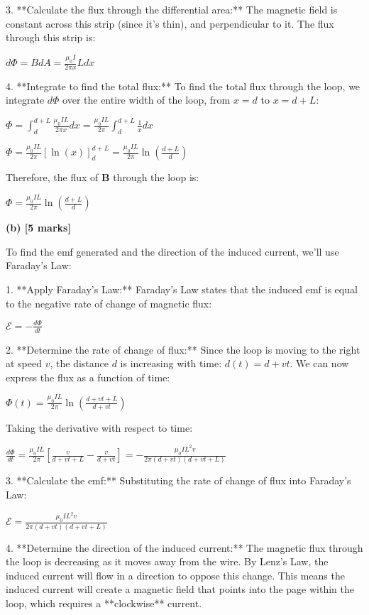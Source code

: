 \documentclass{article}
\begin{document}
3. **Calculate the flux through the differential area:**
The magnetic field is constant across this strip (since it's thin), and perpendicular to it.  The flux through this strip is:

$d\Phi = B dA = \frac{\mu_0 I}{2 \pi x} L dx$

4. **Integrate to find the total flux:**
To find the total flux through the loop, we integrate $d\Phi$ over the entire width of the loop, from $x = d$ to $x = d + L$:

$\Phi = \int_{d}^{d+L} \frac{\mu_0 I L}{2 \pi x} dx = \frac{\mu_0 I L}{2 \pi} \int_{d}^{d+L} \frac{1}{x} dx$

$\Phi = \frac{\mu_0 I L}{2 \pi} \left[ \ln(x) \right]_{d}^{d+L} = \frac{\mu_0 I L}{2 \pi} \ln \left( \frac{d+L}{d} \right)$

Therefore, the flux of $\mathbf{B}$ through the loop is:

$\boxed{\Phi = \frac{\mu_0 I L}{2 \pi} \ln \left( \frac{d+L}{d} \right)}$


\textbf{(b) [5 marks]}

To find the emf generated and the direction of the induced current, we'll use Faraday's Law:

1. **Apply Faraday's Law:**
Faraday's Law states that the induced emf is equal to the negative rate of change of magnetic flux:

$\mathcal{E} = -\frac{d\Phi}{dt}$

2. **Determine the rate of change of flux:**
Since the loop is moving to the right at speed $v$, the distance $d$ is increasing with time: $d(t) = d + vt$.  We can now express the flux as a function of time:

$\Phi(t) = \frac{\mu_0 I L}{2 \pi} \ln \left( \frac{d + vt + L}{d + vt} \right)$

Taking the derivative with respect to time:

$\frac{d\Phi}{dt} = \frac{\mu_0 I L}{2 \pi} \left[ \frac{v}{d + vt + L} - \frac{v}{d + vt} \right] = -\frac{\mu_0 I L^2 v}{2 \pi (d + vt)(d + vt + L)}$

3. **Calculate the emf:**
Substituting the rate of change of flux into Faraday's Law:

$\mathcal{E} =  \frac{\mu_0 I L^2 v}{2 \pi (d + vt)(d + vt + L)}$

4. **Determine the direction of the induced current:**
The magnetic flux through the loop is decreasing as it moves away from the wire. By Lenz's Law, the induced current will flow in a direction to oppose this change. This means the induced current will create a magnetic field that points into the page within the loop, which requires a **clockwise** current.
\end{document}
